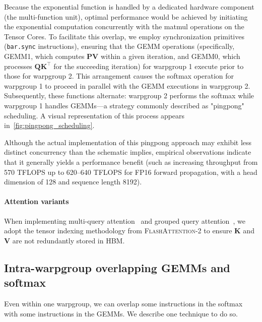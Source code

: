 Because the exponential function is handled by a dedicated hardware component (the multi-function unit), optimal performance would be achieved by initiating the exponential computation concurrently with the matmul operations on the Tensor Cores. To facilitate this overlap, we employ synchronization primitives (\texttt{bar.sync} instructions), ensuring that the GEMM operations (specifically, GEMM1, which computes $\mathbf{P} \mathbf{V}$ within a given iteration, and GEMM0, which processes $\mathbf{Q} \mathbf{K}^\top$ for the succeeding iteration) for warpgroup 1 execute prior to those for warpgroup 2. This arrangement causes the softmax operation for warpgroup 1 to proceed in parallel with the GEMM executions in warpgroup 2. Subsequently, these functions alternate: warpgroup 2 performs the softmax while warpgroup 1 handles GEMMs—a strategy commonly described as "pingpong" scheduling. A visual representation of this process appears in~\cref{fig:pingpong_scheduling}. 

Although the actual implementation of this pingpong approach may exhibit less distinct concurrency than the schematic implies, empirical observations indicate that it generally yields a performance benefit (such as increasing throughput from 570 TFLOPS up to 620--640 TFLOPS for FP16 forward propagation, with a head dimension of 128 and sequence length 8192).

\paragraph{Attention variants} When implementing multi-query attention~\citep{shazeer2019fast} and grouped query attention~\citep{ainslie2023gqa}, we adopt the tensor indexing methodology from \textsc{FlashAttention-2} to ensure $\mathbf{K}$ and $\mathbf{V}$ are not redundantly stored in HBM.

\subsection{Intra-warpgroup overlapping GEMMs and softmax}

Even within one warpgroup, we can overlap some instructions in the softmax with some instructions in the GEMMs. We describe one technique to do so.

